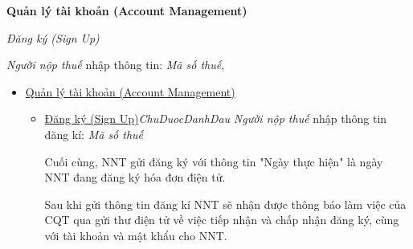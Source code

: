 \textbf{Quản lý tài khoản (Account Management)}

\emph{Đăng ký (Sign Up)}
 
  \emph{     Người nộp thuế }      nhập thông tin:  \emph{Mã số thuế}, 
              
              

              
\begin{itemize}

      \item \underline{Quản lý tài khoản (Account Management)}
  
            \begin{itemize}
  
                \item \underline{Đăng ký (Sign Up)}\emph{ChuDuocDanhDau}
                \emph{     Người nộp thuế }      nhập thông tin đăng kí:  \emph{Mã số thuế} 
                
                      
              



                    Cuối cùng, NNT gửi đăng ký với thông tin "Ngày thực hiện" là ngày NNT đang đăng ký hóa đơn điện tử.

                    Sau khi gửi thông tin đăng kí NNT sẽ nhận được thông báo làm việc của CQT qua gửi thư điện tử về việc tiếp nhận và chấp nhận đăng ký, cùng với tài khoản và mật khẩu cho NNT.





\end{itemize}
\end{itemize}
